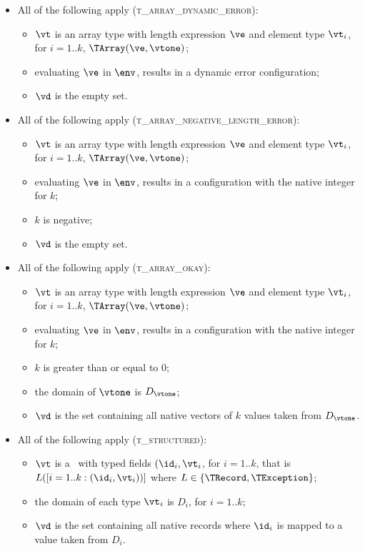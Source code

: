 \begin{itemize}
  \item All of the following apply (\textsc{t\_array\_dynamic\_error}):
  \begin{itemize}
    \item $\vt$ is an array type with length expression $\ve$ and element type $\vt_i$, for $i=1..k$, $\TArray(\ve, \vtone)$;
    \item evaluating $\ve$ in $\env$, results in a dynamic error configuration;
    \item $\vd$ is the empty set.
  \end{itemize}

  \item All of the following apply (\textsc{t\_array\_negative\_length\_error}):
  \begin{itemize}
    \item $\vt$ is an array type with length expression $\ve$ and element type $\vt_i$, for $i=1..k$, $\TArray(\ve, \vtone)$;
    \item evaluating $\ve$ in $\env$, results in a configuration with the native integer for $k$;
    \item $k$ is negative;
    \item $\vd$ is the empty set.
  \end{itemize}

  \item All of the following apply (\textsc{t\_array\_okay}):
  \begin{itemize}
    \item $\vt$ is an array type with length expression $\ve$ and element type $\vt_i$, for $i=1..k$, $\TArray(\ve, \vtone)$;
    \item evaluating $\ve$ in $\env$, results in a configuration with the native integer for $k$;
    \item $k$ is greater than or equal to $0$;
    \item the domain of $\vtone$ is $D_\vtone$;
    \item $\vd$ is the set containing all native vectors of $k$ values taken from $D_\vtone$.
  \end{itemize}

  \item All of the following apply (\textsc{t\_structured}):
  \begin{itemize}
    \item $\vt$ is a \structuredtype\ with typed fields $(\id_i, \vt_i$, for $i=1..k$, that is $L([i=1..k: (\id_i,\vt_i))]$
    where $L\in\{\TRecord, \TException\}$;
    \item the domain of each type $\vt_i$ is $D_i$, for $i=1..k$;
    \item $\vd$ is the set containing all native records where $\id_i$ is mapped to a value taken from $D_i$.
  \end{itemize}


\end{itemize}
